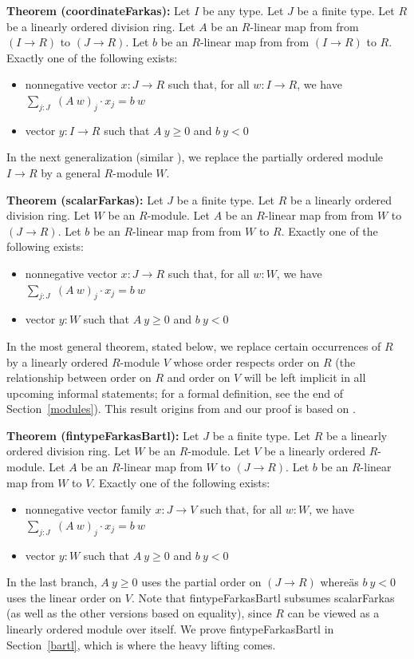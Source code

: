 \documentclass[]{article}
\renewcommand{\.}{\hskip .75pt}
\newcommand{\sekt}[1]{Section~\ref{#1}}
\let\r=\rightarrow
\begin{document}
\medskip \noindent
\textbf{Theorem (coordinateFarkas):}
Let $I$ be any type.
Let $J$ be a finite type.
Let $R$ be a linearly ordered division ring.
Let $A$ be an $R$-linear map from from $(I \r R)$ to $(J \r R)$.
Let $b$ be an $R$-linear map from from $(I \r R)$ to $R$.
Exactly one of the following exists:
\begin{itemize}
\item nonnegative vector $x : J \r R$ such that, for all $w : I \r R$, we have
$ \sum_{j : J}\; (A~w)_j \cdot x_j = b~w $
\item vector $y : I \r R$ such that $A~y \ge 0$ and $b~y < 0$
\end{itemize}
In the next generalization (similar \cite{Chernikov}), we replace
the partially ordered module $I \r R$ by a general $R$-module $W$.

\medskip \noindent
\textbf{Theorem (scalarFarkas):}
Let $J$ be a finite type.
Let $R$ be a linearly ordered division ring.
Let $W$ be an $R$-module.
Let $A$ be an $R$-linear map from from $W$ to $(J \r R)$.
Let $b$ be an $R$-linear map from from $W$ to $R$.
Exactly one of the following exists:
\begin{itemize}
\item nonnegative vector $x : J \r R$ such that, for all $w : W$, we have
$ \sum_{j : J}\; (A~w)_j \cdot x_j = b~w $
\item vector $y : W$ such that $A~y \ge 0$ and $b~y < 0$
\end{itemize}
In the most general theorem, stated below, we replace certain occurrences of $R$ by
a linearly ordered $R$-module $V$ whose order respects order on $R$ (the
relationship between order on $R$ and order on $V$ will be left implicit
in all upcoming informal statements; for a formal definition, see the end of
\sekt{modules}). This result origins from \cite{Bartl2007} and our proof is based on
\cite{Bartl2011}.

\medskip \noindent
\textbf{Theorem (fintypeFarkasBartl):}
Let $J$ be a finite type.
Let $R$ be a linearly ordered division ring.
Let $W$ be an $R$-module.
Let $V$ be a linearly ordered $R$-module.
Let $A$ be an $R$-linear map from $W$ to $(J \r R)$.
Let $b$ be an $R$-linear map from $W$ to $V$.
Exactly one of the following exists:
\begin{itemize}
\item nonnegative vector family $x : J \r V$ such that, for all $w : W$, we have
$ \sum_{j : J}\; (A~w)_j \cdot x_j = b~w $
\item vector $y : W$ such that $A~y \ge 0$ and $b~y < 0$
\end{itemize}
In the last branch, $A~y \ge 0$ uses the partial order on $(J \r R)$ whereäs
$b~y < 0$ uses the linear order on $V$.
Note that fintypeFarkasBartl subsumes scalarFarkas (as well as the other versions based on equality),
since $R$ can be viewed as a linearly ordered module over itself.
We prove fintypeFarkasBartl in \sekt{bartl}, which is where the heavy lifting comes.
\end{document}
